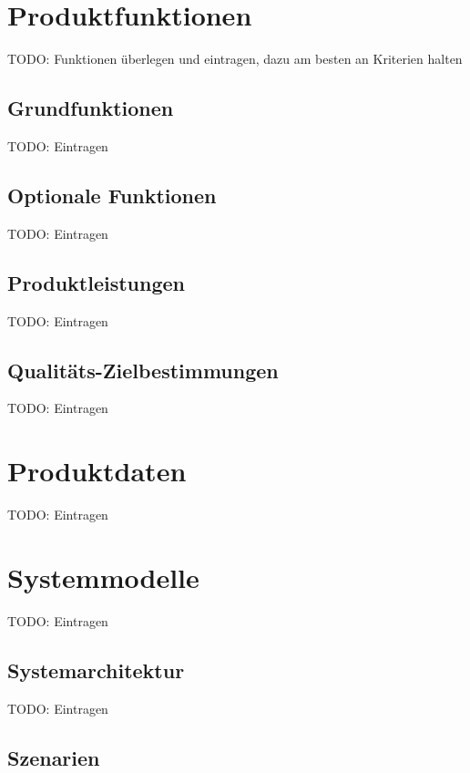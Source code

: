 \documentclass[a4paper]{scrreprt}
\begin{document}
\chapter{Produktfunktionen}
TODO: Funktionen überlegen und eintragen, dazu am besten an Kriterien halten

\section{Grundfunktionen}
TODO: Eintragen

\section{Optionale Funktionen}
TODO: Eintragen

\section{Produktleistungen}
TODO: Eintragen

\section{Qualitäts-Zielbestimmungen}
TODO: Eintragen

\chapter{Produktdaten}
TODO: Eintragen

\chapter{Systemmodelle}
TODO: Eintragen
\section{Systemarchitektur}
TODO: Eintragen
\section{Szenarien}
\end{document}
